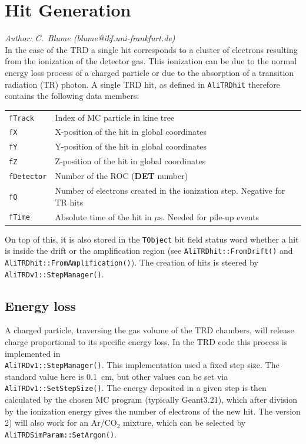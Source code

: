 \documentclass{alicetdr}
\begin{document}
\section{Hit Generation}
%
{\it Author: C.~Blume (blume@ikf.uni-frankfurt.de)}
\smallskip
\\
%
In the case of the TRD a single hit corresponds to a cluster of electrons 
resulting from the ionization of the detector gas.  This ionization can be due
to the normal energy loss process of a charged particle or due to the 
absorption of a transition radiation (TR) photon.  A single TRD hit, as
defined in {\tt AliTRDhit} therefore contains the following data members:
%
\begin{center}
\begin{tabular}{ll}
{\tt fTrack}    & Index of MC particle in kine tree                                        \\
{\tt fX}        & X-position of the hit in global coordinates                              \\
{\tt fY}        & Y-position of the hit in global coordinates                              \\
{\tt fZ}        & Z-position of the hit in global coordinates                              \\
{\tt fDetector} & Number of the ROC ({\bf DET} number)                                     \\
{\tt fQ}        & Number of electrons created in the ionization step. Negative for TR hits \\
{\tt fTime}     & Absolute time of the hit in $\mu$s. Needed for pile-up events            \\
\end{tabular}
\end{center}
%
On top of this, it is also stored in the {\tt TObject} bit field status word  
whether a hit is inside the drift or the amplification region 
(see {\tt AliTRDhit::FromDrift()} and {\tt AliTRDhit::FromAmplification()}).
The creation of hits is steered by {\tt AliTRDv1::StepManager()}.
%
\subsection{Energy loss}
%
A charged particle, traversing the gas volume of the TRD chambers, will release
charge proportional to its specific energy loss.  In the TRD code this process
is implemented in \\{\tt AliTRDv1::StepManager()}.  This implementation used a 
fixed step size.  The standard value here is 0.1~cm, but other values can be
set via {\tt AliTRDv1::SetStepSize()}.  The energy deposited in a given step is
then calculated by the chosen MC program (typically Geant3.21), which after
division by the ionization energy gives the number of electrons of the new hit.
The version 2) will also work for an Ar/CO$_{2}$ mixture, which can be selected
by \\{\tt AliTRDSimParam::SetArgon()}. 
%
\end{document}

